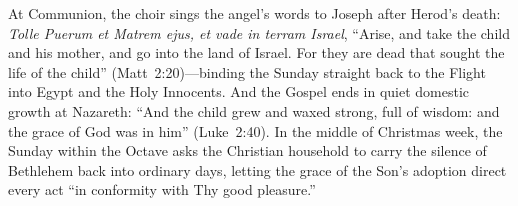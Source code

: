 At Communion, the choir sings the angel's words to Joseph after Herod's death:
\textit{Tolle Puerum et Matrem ejus, et vade in terram Israel}, ``Arise, and
take the child and his mother, and go into the land of Israel. For they are dead
that sought the life of the child'' (Matt~2:20)---binding the Sunday straight
back to the Flight into Egypt and the Holy Innocents. And the Gospel ends in
quiet domestic growth at Nazareth: ``And the child grew and waxed strong, full
of wisdom: and the grace of God was in him'' (Luke~2:40). In the middle of
Christmas week, the Sunday within the Octave asks the Christian household to
carry the silence of Bethlehem back into ordinary days, letting the grace of the
Son's adoption direct every act ``in conformity with Thy good pleasure.''
